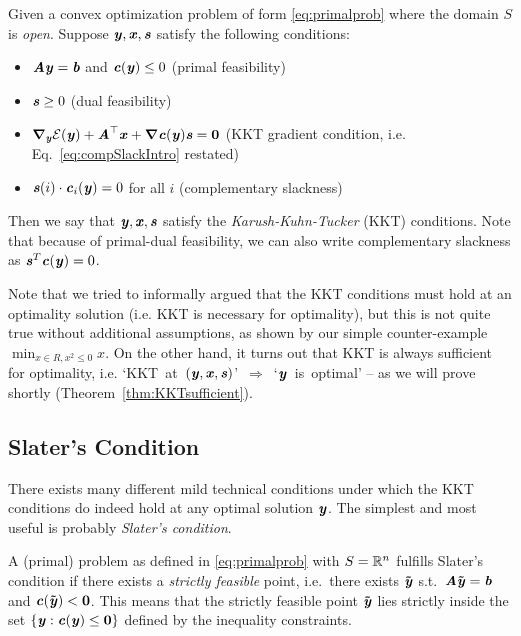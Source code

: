 \begin{definition}
  Given a convex optimization problem of form
  \eqref{eq:primalprob} where the domain $S$ is \emph{open}.
  Suppose $\yy, \xx, \ss$ satisfy the following conditions:
  \begin{itemize}
  \item $\AA\yy = \bb$ and $\cc(\yy) \leq 0$ \hfill (primal feasibility)
  \item $\ss \geq 0$ \hfill (dual feasibility)
  \item $\grad_{\yy}\calE(\yy) + \AA^\trp\xx +
    \grad\cc(\yy) \ss = \matzero$ \hfill
    (KKT gradient condition, i.e. Eq.~\eqref{eq:compSlackIntro} restated)
  \item $\ss(i)\cdot\cc_i(\yy) = 0$ for all $i$ \hfill (complementary slackness)
  \end{itemize}
  Then we say that $\yy, \xx, \ss$ satisfy the
  \emph{Karush-Kuhn-Tucker} (KKT) conditions.
  Note that because of primal-dual feasibility, we can also write
  complementary slackness as  $\ss^T \cc(\yy)= 0$.
\end{definition}

Note that we tried to informally argued that the KKT conditions must
hold at an optimality solution (i.e. KKT is necessary for optimality),
but this is not quite true without additional assumptions, as shown by
our simple counter-example $\min_{x \in R, x^2 \leq 0} x$.
On the other hand, it turns out that KKT is always sufficient for
optimality,
i.e. \mbox{`KKT at $(\yy, \xx, \ss)$' $\Rightarrow$ `$\yy$ is optimal'}
-- as
we will prove shortly (Theorem~\ref{thm:KKTsufficient}).

\subsection{Slater's Condition}
There exists many different mild technical conditions under which the
KKT conditions do indeed hold at any optimal solution $\yy$.
The simplest and most useful is probably \emph{Slater's condition}.

\begin{definition} \label{def:slater}
A (primal) problem as defined in \eqref{eq:primalprob} with $S = \R^n$ fulfills
Slater's condition if there exists a \emph{strictly feasible} point,
i.e.\ there exists $\yytil$ s.t.\ $\AA\yytil = \bb$ and $\cc(\yytil) <
\veczero$.
This means that the strictly feasible point $\yytil$ lies strictly inside the set $\{\yy : \cc(\yy) \leq \veczero\}$ defined by the inequality constraints.
\end{definition}


